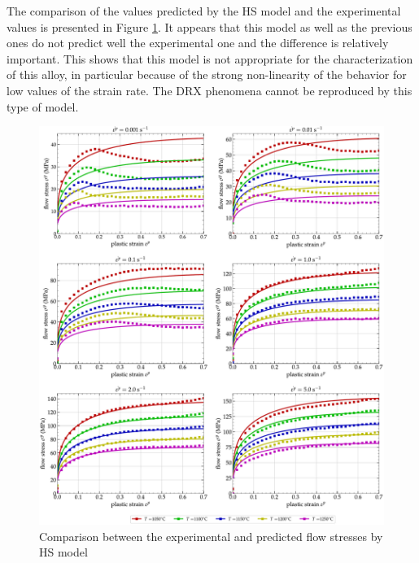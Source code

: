 \documentclass[twoside,english,1p,final,sort&compress]{elsarticle}
\theoremstyle{plain}
\begin{document}
The comparison of the values predicted by the HS model and the experimental values is presented in Figure \ref{fig:iCorrelationHS}. 
It appears that this model as well as the previous ones do not predict well the experimental one and the difference is relatively important. 
This shows that this model is not appropriate for the characterization of this alloy, in particular because of the strong non-linearity of the behavior for low values of the strain rate. 
The DRX phenomena cannot be reproduced by this type of model.

\begin{figure}[!ht]
\centering
\includegraphics[width=1.02\columnwidth]
{Figures/CompExpHS}
\caption{Comparison between the experimental and predicted flow stresses by HS model}
\label{fig:iCorrelationHS}
\end{figure}

\end{document}
